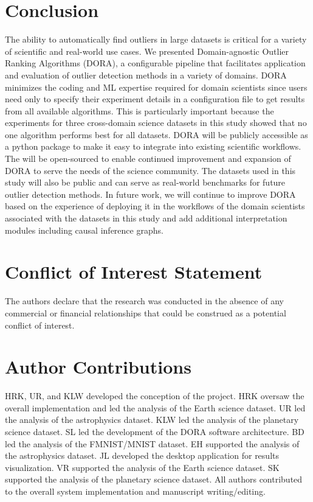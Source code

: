 \documentclass[utf8]{frontiersFPHY} %
\begin{document}
\section{Conclusion}
The ability to automatically find outliers in large datasets is critical
for a variety of scientific and real-world use cases. 
We presented Domain-agnostic Outlier Ranking Algorithms (DORA),
a configurable pipeline that facilitates application and evaluation of
outlier detection methods in a variety of domains. DORA minimizes the
coding and ML expertise required for domain scientists since users
need only to specify their experiment details in a configuration file
to get results from all available algorithms. This is particularly important
because the experiments for three cross-domain science datasets in this
study showed that no one algorithm performs best for all datasets.
DORA will be publicly accessible as a python package to make it
easy to integrate into existing scientific workflows. 
The will be
open-sourced to enable continued improvement and expansion of DORA
to serve the needs of the science community. The datasets used in this
study will also be public and can serve as real-world benchmarks 
for future outlier detection methods. In future work, we will
continue to improve DORA based on the experience of deploying it in
the workflows of the domain scientists associated with the datasets in
this study and add additional interpretation modules 
including causal inference graphs.


\section*{Conflict of Interest Statement}

The authors declare that the research was conducted in the absence of any commercial or financial relationships that could be construed as a potential conflict of interest.

\section*{Author Contributions}
HRK, UR, and KLW developed the conception of the project. HRK oversaw the overall implementation and led the analysis of the Earth science dataset. UR led the analysis of the astrophysics dataset. KLW led the analysis of the planetary science dataset. SL led the development of the DORA software architecture. BD led the analysis of the FMNIST/MNIST dataset. EH supported the analysis of the astrophysics dataset. JL developed the desktop application for results visualization. VR supported the analysis of the Earth science dataset. SK supported the analysis of the planetary science dataset. All authors contributed to the overall system implementation and manuscript writing/editing. 
\end{document}
